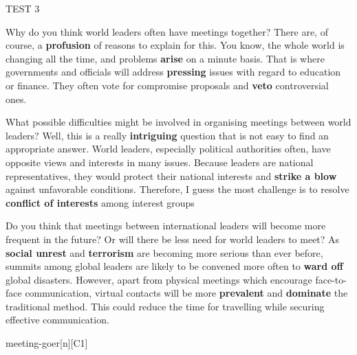 \begin{glossarymc}[Cambridge 8]
\begin{test}{TEST 3}
    \begin{qa}{Why do you think world leaders often have meetings together?}
    There are, of course, a \textbf{profusion} of reasons to explain for this. You know, the whole world is changing all the time, and problems \textbf{arise} on a minute basis. That is where governments and officials will address \textbf{pressing} issues with regard to education or finance. They often vote for compromise proposals and \textbf{veto} controversial ones.
    \end{qa}

    \begin{qa}{What possible difficulties might be involved in organising meetings between world leaders?}
    Well, this is a really \textbf{intriguing} question that is not easy to find an appropriate answer. World leaders, especially political authorities often, have opposite views and interests in many issues. Because leaders are national representatives, they would protect their national interests and \textbf{strike a blow} against unfavorable conditions. Therefore, I guess the most challenge is to resolve \textbf{conflict of interests} among interest groups
    \end{qa}

    \begin{qa}{Do you think that meetings between international leaders will become more frequent in the future? Or will there be less need for world leaders to meet?}
    As \textbf{social unrest} and \textbf{terrorism} are becoming more serious than ever before, summits among global leaders are likely to be convened more often to \textbf{ward off} global disasters. However, apart from physical meetings which encourage face-to-face communication, virtual contacts will be more \textbf{prevalent} and \textbf{dominate} the traditional method. This could reduce the time for travelling while securing effective communication.
    \end{qa}

        \begin{VocabExplain}[Part 3]
            \begin{ExplainCard}{meeting-goer}[n][C1]
            \end{ExplainCard}


\end{VocabExplain}
\end{test}
\end{glossarymc}
